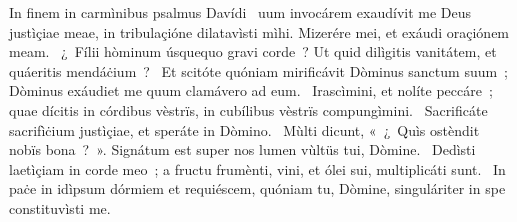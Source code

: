 { In finem in carmìnibus psalmus Davídi}
{%
~uum invocárem exaudívit me Deus justìçiae meae, in tribulaçióne dilatavìsti mìhi. Mizerére mei, et exáudi oraçiónem meam. 
~¿~Fílii hòminum úsquequo gravi corde~? Ut quid dilìgitis vanitátem, et quáeritis mendáċium~? 
~Et scitóte quóniam mirificávit Dòminus sanctum suum~; Dòminus exáudiet me quum clamávero ad eum. 
~Irascìmini, et nolíte peccáre~; quae dícitis in córdibus vèstrïs, in cubílibus vèstrïs compungìmini. 
~Sacrificáte sacrifìċium justìçiae, et speráte in Dòmino. 
~Mùlti dicunt, «~¿~Quìs ostèndit nobïs bona~?~». Signátum est super nos lumen vùltüs tui, Dòmine. 
~Dedìsti laetìçiam in corde meo~; a fructu frumènti, vini, et ólei sui, multiplicáti sunt. 
~In paċe in idìpsum dórmiem et requiéscem, quóniam tu, Dòmine, singuláriter in spe constituvìsti me. 
}
